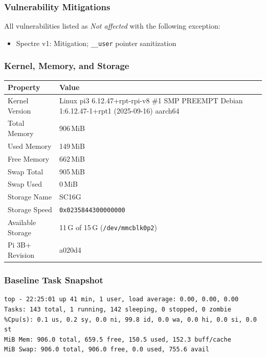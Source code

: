 \documentclass[11pt,letterpaper]{article}
\newcommand{\code}[1]{\texttt{#1}}
\begin{document}
\subsubsection{Vulnerability Mitigations}

All vulnerabilities listed as \textit{Not affected} with the following exception:
\begin{itemize}[noitemsep]
    \item Spectre v1: Mitigation; \code{\_\_user} pointer sanitization
\end{itemize}

\subsubsection{Kernel, Memory, and Storage}

\begin{tabular}{@{}L{5cm}L{9cm}@{}}
\toprule
\textbf{Property} & \textbf{Value} \\
\midrule
Kernel Version   & Linux pi3 6.12.47+rpt-rpi-v8 \#1 SMP PREEMPT Debian 1:6.12.47-1+rpt1 (2025-09-16) aarch64 \\
Total Memory     & 906\,MiB \\
Used Memory      & 149\,MiB \\
Free Memory      & 662\,MiB \\
Swap Total       & 905\,MiB \\
Swap Used        & 0\,MiB \\
Storage Name     & SC16G \\
Storage Speed    & \code{0x0235844300000000} \\
Available Storage & 11\,G of 15\,G (\code{/dev/mmcblk0p2}) \\
Pi 3B+ Revision  & a020d4 \\
\bottomrule
\end{tabular}

\subsubsection{Baseline Task Snapshot}

\begin{verbatim}
top - 22:25:01 up 41 min, 1 user, load average: 0.00, 0.00, 0.00
Tasks: 143 total, 1 running, 142 sleeping, 0 stopped, 0 zombie
%Cpu(s): 0.1 us, 0.2 sy, 0.0 ni, 99.8 id, 0.0 wa, 0.0 hi, 0.0 si, 0.0 st
MiB Mem: 906.0 total, 659.5 free, 150.5 used, 152.3 buff/cache
MiB Swap: 906.0 total, 906.0 free, 0.0 used, 755.6 avail
\end{verbatim}
\end{document}
